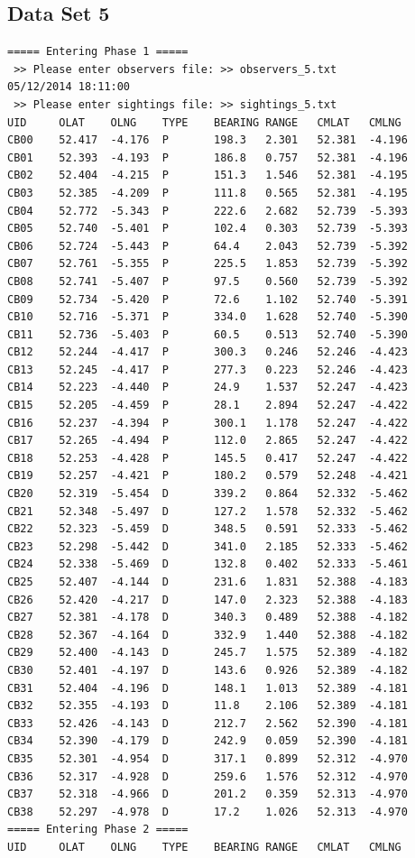 \documentclass[10pt]{article}
\begin{document}
        \subsection{Data Set 5}
            \begin{verbatim}
===== Entering Phase 1 =====
 >> Please enter observers file: >> observers_5.txt
05/12/2014 18:11:00
 >> Please enter sightings file: >> sightings_5.txt
UID     OLAT    OLNG    TYPE    BEARING RANGE   CMLAT   CMLNG
CB00    52.417  -4.176  P       198.3   2.301   52.381  -4.196
CB01    52.393  -4.193  P       186.8   0.757   52.381  -4.196
CB02    52.404  -4.215  P       151.3   1.546   52.381  -4.195
CB03    52.385  -4.209  P       111.8   0.565   52.381  -4.195
CB04    52.772  -5.343  P       222.6   2.682   52.739  -5.393
CB05    52.740  -5.401  P       102.4   0.303   52.739  -5.393
CB06    52.724  -5.443  P       64.4    2.043   52.739  -5.392
CB07    52.761  -5.355  P       225.5   1.853   52.739  -5.392
CB08    52.741  -5.407  P       97.5    0.560   52.739  -5.392
CB09    52.734  -5.420  P       72.6    1.102   52.740  -5.391
CB10    52.716  -5.371  P       334.0   1.628   52.740  -5.390
CB11    52.736  -5.403  P       60.5    0.513   52.740  -5.390
CB12    52.244  -4.417  P       300.3   0.246   52.246  -4.423
CB13    52.245  -4.417  P       277.3   0.223   52.246  -4.423
CB14    52.223  -4.440  P       24.9    1.537   52.247  -4.423
CB15    52.205  -4.459  P       28.1    2.894   52.247  -4.422
CB16    52.237  -4.394  P       300.1   1.178   52.247  -4.422
CB17    52.265  -4.494  P       112.0   2.865   52.247  -4.422
CB18    52.253  -4.428  P       145.5   0.417   52.247  -4.422
CB19    52.257  -4.421  P       180.2   0.579   52.248  -4.421
CB20    52.319  -5.454  D       339.2   0.864   52.332  -5.462
CB21    52.348  -5.497  D       127.2   1.578   52.332  -5.462
CB22    52.323  -5.459  D       348.5   0.591   52.333  -5.462
CB23    52.298  -5.442  D       341.0   2.185   52.333  -5.462
CB24    52.338  -5.469  D       132.8   0.402   52.333  -5.461
CB25    52.407  -4.144  D       231.6   1.831   52.388  -4.183
CB26    52.420  -4.217  D       147.0   2.323   52.388  -4.183
CB27    52.381  -4.178  D       340.3   0.489   52.388  -4.182
CB28    52.367  -4.164  D       332.9   1.440   52.388  -4.182
CB29    52.400  -4.143  D       245.7   1.575   52.389  -4.182
CB30    52.401  -4.197  D       143.6   0.926   52.389  -4.182
CB31    52.404  -4.196  D       148.1   1.013   52.389  -4.181
CB32    52.355  -4.193  D       11.8    2.106   52.389  -4.181
CB33    52.426  -4.143  D       212.7   2.562   52.390  -4.181
CB34    52.390  -4.179  D       242.9   0.059   52.390  -4.181
CB35    52.301  -4.954  D       317.1   0.899   52.312  -4.970
CB36    52.317  -4.928  D       259.6   1.576   52.312  -4.970
CB37    52.318  -4.966  D       201.2   0.359   52.313  -4.970
CB38    52.297  -4.978  D       17.2    1.026   52.313  -4.970
===== Entering Phase 2 =====
UID     OLAT    OLNG    TYPE    BEARING RANGE   CMLAT   CMLNG


\end{verbatim}
\end{document}
